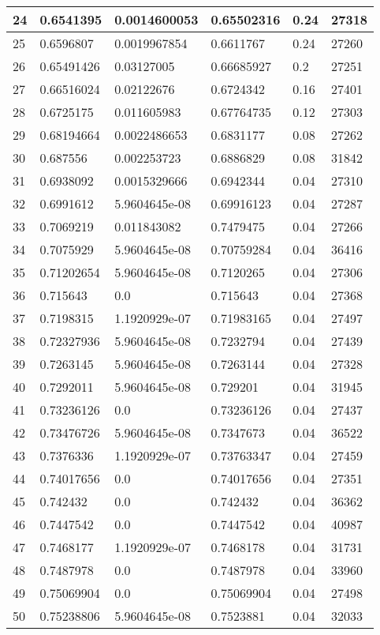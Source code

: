 \begin{longtable}{|l|l|l|l|l|l|}
24 & 0.6541395 & 0.0014600053 & 0.65502316 & 0.24 & 27318 \\ \hline 
25 & 0.6596807 & 0.0019967854 & 0.6611767 & 0.24 & 27260 \\ \hline 
26 & 0.65491426 & 0.03127005 & 0.66685927 & 0.2 & 27251 \\ \hline 
27 & 0.66516024 & 0.02122676 & 0.6724342 & 0.16 & 27401 \\ \hline 
28 & 0.6725175 & 0.011605983 & 0.67764735 & 0.12 & 27303 \\ \hline 
29 & 0.68194664 & 0.0022486653 & 0.6831177 & 0.08 & 27262 \\ \hline 
30 & 0.687556 & 0.002253723 & 0.6886829 & 0.08 & 31842 \\ \hline 
31 & 0.6938092 & 0.0015329666 & 0.6942344 & 0.04 & 27310 \\ \hline 
32 & 0.6991612 & 5.9604645e-08 & 0.69916123 & 0.04 & 27287 \\ \hline 
33 & 0.7069219 & 0.011843082 & 0.7479475 & 0.04 & 27266 \\ \hline 
34 & 0.7075929 & 5.9604645e-08 & 0.70759284 & 0.04 & 36416 \\ \hline 
35 & 0.71202654 & 5.9604645e-08 & 0.7120265 & 0.04 & 27306 \\ \hline 
36 & 0.715643 & 0.0 & 0.715643 & 0.04 & 27368 \\ \hline 
37 & 0.7198315 & 1.1920929e-07 & 0.71983165 & 0.04 & 27497 \\ \hline 
38 & 0.72327936 & 5.9604645e-08 & 0.7232794 & 0.04 & 27439 \\ \hline 
39 & 0.7263145 & 5.9604645e-08 & 0.7263144 & 0.04 & 27328 \\ \hline 
40 & 0.7292011 & 5.9604645e-08 & 0.729201 & 0.04 & 31945 \\ \hline 
41 & 0.73236126 & 0.0 & 0.73236126 & 0.04 & 27437 \\ \hline 
42 & 0.73476726 & 5.9604645e-08 & 0.7347673 & 0.04 & 36522 \\ \hline 
43 & 0.7376336 & 1.1920929e-07 & 0.73763347 & 0.04 & 27459 \\ \hline 
44 & 0.74017656 & 0.0 & 0.74017656 & 0.04 & 27351 \\ \hline 
45 & 0.742432 & 0.0 & 0.742432 & 0.04 & 36362 \\ \hline 
46 & 0.7447542 & 0.0 & 0.7447542 & 0.04 & 40987 \\ \hline 
47 & 0.7468177 & 1.1920929e-07 & 0.7468178 & 0.04 & 31731 \\ \hline 
48 & 0.7487978 & 0.0 & 0.7487978 & 0.04 & 33960 \\ \hline 
49 & 0.75069904 & 0.0 & 0.75069904 & 0.04 & 27498 \\ \hline 
50 & 0.75238806 & 5.9604645e-08 & 0.7523881 & 0.04 & 32033 \\ \hline 
\end{longtable}